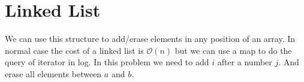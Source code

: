 \section{Linked List}

We can use this structure to add/erase elements in any position of an array. In normal case the cost of a linked list is $\mathcal{O}(n)$ but we can use a map to do the query of iterator in log. In this problem we need to add $i$ after a number $j$. And erase all elements between $a$ and $b$.

